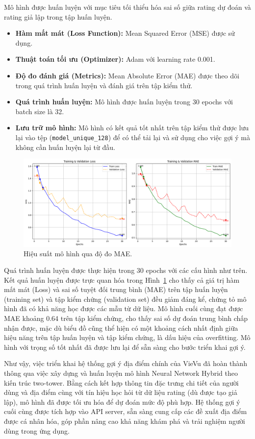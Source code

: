 \begin{enumerate}
Mô hình được huấn luyện với mục tiêu tối thiểu hóa sai số giữa rating dự đoán và rating giả lập trong tập huấn luyện.
    \begin{itemize}
        \item \textbf{Hàm mất mát (Loss Function):} Mean Squared Error (MSE) được sử dụng.
        \item \textbf{Thuật toán tối ưu (Optimizer):} Adam với learning rate 0.001.
        \item \textbf{Độ đo đánh giá (Metrics):} Mean Absolute Error (MAE) được theo dõi trong quá trình huấn luyện và đánh giá trên tập kiểm thử.
        \item \textbf{Quá trình huấn luyện:} Mô hình được huấn luyện trong 30 epochs với batch size là 32.
        \item \textbf{Lưu trữ mô hình:} Mô hình có kết quả tốt nhất trên tập kiểm thử được lưu lại vào tệp (\texttt{model\_unique\_128}) để có thể tải lại và sử dụng cho việc gợi ý mà không cần huấn luyện lại từ đầu.
    \end{itemize}

    \begin{figure}[H]
        \centering
        \includegraphics[width=1\textwidth]{figures/c4/128.png}
        \caption{Hiệu suất mô hình qua độ đo MAE.}
        \label{fig:mae}
    \end{figure}
    \noindent Quá trình huấn luyện được thực hiện trong 30 epochs với các cấu hình như trên. Kết quả huấn luyện được trực quan hóa trong Hình~\ref{fig:mae}  cho thấy cả giá trị hàm mất mát (Loss) và sai số tuyệt đối trung bình (MAE) trên tập huấn luyện (training set) và tập kiểm chứng (validation set) đều giảm đáng kể, chứng tỏ mô hình đã có khả năng học được các mẫu từ dữ liệu. Mô hình cuối cùng đạt được MAE khoảng 0.64 trên tập kiểm chứng, cho thấy sai số dự đoán trung bình chấp nhận được, mặc dù biểu đồ cũng thể hiện có một khoảng cách nhất định giữa hiệu năng trên tập huấn luyện và tập kiểm chứng, là dấu hiệu của overfitting. Mô hình với trọng số tốt nhất đã được lưu lại để sẵn sàng cho bước triển khai gợi ý.

\end{enumerate}
Như vậy, việc triển khai hệ thống gợi ý địa điểm chính của VieVu đã hoàn thành thông qua việc xây dựng và huấn luyện mô hình Neural Network Hybrid theo kiến trúc two-tower. Bằng cách kết hợp thông tin đặc trưng chi tiết của người dùng và địa điểm cùng với tín hiệu học hỏi từ dữ liệu rating (dù được tạo giả lập), mô hình đã được tối ưu hóa để dự đoán mức độ phù hợp. Hệ thống gợi ý cuối cùng được tích hợp vào API server, sẵn sàng cung cấp các đề xuất địa điểm được cá nhân hóa, góp phần nâng cao khả năng khám phá và trải nghiệm người dùng trong ứng dụng.